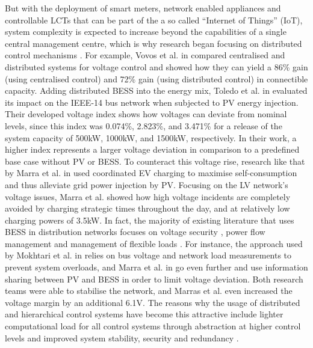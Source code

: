 But with the deployment of smart meters, network enabled appliances and controllable LCTs that can be part of the a so called ``Internet of Things'' (IoT), system complexity is expected to increase beyond the capabilities of a single central management centre, which is why research began focusing on distributed control mechanisms \cite{Vovos2007, Guerrero2008, Bidram2014, Toledo2013, Marra2013, Gill2014, Dolan2012, Atia2016, Bidram2012, Wang2016}.
For example, Vovos et al. in \cite{Vovos2007} compared centralised and distributed systems for voltage control and showed how they can yield a 86\% gain (using centralised control) and 72\% gain (using distributed control) in connectible capacity.
Adding distributed BESS into the energy mix, Toledo et al. in \cite{Toledo2013} evaluated its impact on the IEEE-14 bus network when subjected to PV energy injection.
Their developed voltage index shows how voltages can deviate from nominal levels, since this index was 0.074\%, 2.823\%, and 3.471\% for a release of the system capacity of 500kW, 1000kW, and 1500kW, respectively.
In their work, a higher index represents a larger voltage deviation in comparison to a predefined base case without PV or BESS.
To counteract this voltage rise, research like that by Marra et al. in \cite{Marra2013} used coordinated EV charging to maximise self-consumption and thus alleviate grid power injection by PV.
Focusing on the LV network's voltage issues, Marra et al. showed how high voltage incidents are completely avoided by charging strategic times throughout the day, and at relatively low charging powers of 3.5kW.
In fact, the majority of existing literature that uses BESS in distribution networks focuses on voltage security \cite{Sugihara2013, Toledo2013, Marra2013, Mokhtari2013, Atia2016}, power flow management \cite{Guerrero2008, Wang2016} and management of flexible loads \cite{Gill2014, Dolan2012}.
For instance, the approach used by Mokhtari et al. in \cite{Mokhtari2013} relies on bus voltage and network load measurements to prevent system overloads, and Marra et al. in \cite{Marra2013} go even further and use information sharing between PV and BESS in order to limit voltage deviation.
Both research teams were able to stabilise the network, and Marras et al. even increased the voltage margin by an additional 6.1V.
The reasons why the usage of distributed and hierarchical control systems have become this attractive include lighter computational load for all control systems through abstraction at higher control levels and improved system stability, security and redundancy \cite{Guerrero2013, Guerrero2013a}.

